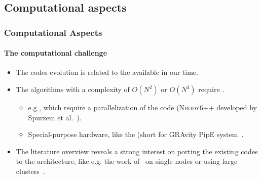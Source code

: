 \subsection{Computational aspects}
\begin{frame}
    \frametitle{Computational Aspects}
    \framesubtitle{The computational challenge}

    \begin{itemize}
        \item The {\nbody} codes evolution is related to the available
                 in our time.
        \item The algorithms with a complexity of $O(N^{2})$ or $O(N^{3})$ require
                .
        \begin{itemize}
            \item  e.g ,
                which require a parallelization of the code
                (\textsc{Nbody6++} developed by Spurzem et al.~\cite{Spurzem1999}).

            \item Special-purpose hardware, like the  (short for GRAvity
                PipE system~\cite{TMFES96,MT98,Makino98,GRAPE6A}.
        \end{itemize}

        \item  The literature overview reveals a strong interest on porting the existing codes to the
             architecture, like e.g. the work
            of~\cite{Portegies2007a,Hamada2007,Belleman2008}
            on single nodes or using large
            clusters~\cite{berczik2011high,NitadoriAarseth2012,Capuzzo-DolcettaEtAl2013}.

    \end{itemize}

\end{frame}

